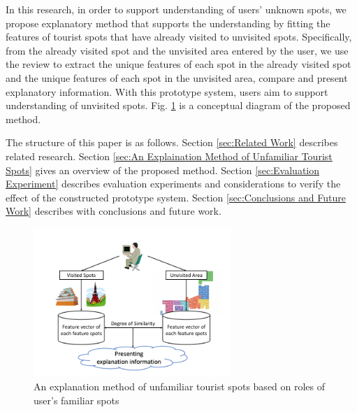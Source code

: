 \documentclass[journal]{IAENGtran}
\begin{document}
In this research, in order to support understanding of users' unknown spots, we propose explanatory method that supports the understanding by fitting the features of tourist spots that have already visited to unvisited spots.
Specifically, from the already visited spot and the unvisited area entered by the user, we use the review to extract the unique features of each spot in the already visited spot and the unique features of each spot in the unvisited area, compare and present explanatory information.
With this prototype system, users aim to support understanding of unvisited spots.
Fig. \ref{fig:Photo_Image} is a conceptual diagram of the proposed method.

The structure of this paper is as follows.
Section \ref{sec:Related Work} describes related research.
Section \ref{sec:An Explaination Method of Unfamiliar Tourist Spots} gives an overview of the proposed method.
Section \ref{sec:Evaluation Experiment} describes evaluation experiments and considerations to verify the effect of the constructed prototype system.
Section \ref{sec:Conclusions and Future Work} describes with conclusions and future work.

\begin{figure}[t]
  \begin{center}
    \includegraphics[clip,width=7.5cm,bb=0 0 720 540]{picture/Photo_Image_eng.png}
    \caption{An explanation method of unfamiliar tourist spots based on roles of user's familiar spots}
    \label{fig:Photo_Image}
   \end{center}
\end{figure}
\end{document}
